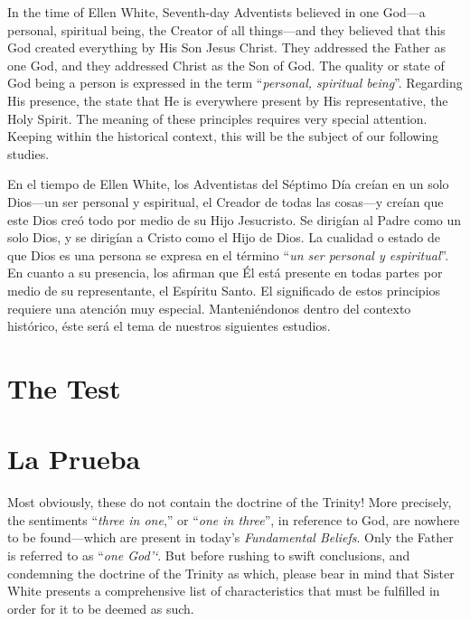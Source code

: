 In the time of Ellen White, Seventh-day Adventists believed in one God—a personal, spiritual being, the Creator of all things—and they believed that this God created everything by His Son Jesus Christ. They addressed the Father as one God, and they addressed Christ as the Son of God. The quality or state of God being a person is expressed in the term “\textit{personal, spiritual being}”. Regarding His presence, the  state that He is everywhere present by His representative, the Holy Spirit. The meaning of these principles requires very special attention. Keeping within the historical context, this will be the subject of our following studies.


En el tiempo de Ellen White, los Adventistas del Séptimo Día creían en un solo Dios—un ser personal y espiritual, el Creador de todas las cosas—y creían que este Dios creó todo por medio de su Hijo Jesucristo. Se dirigían al Padre como un solo Dios, y se dirigían a Cristo como el Hijo de Dios. La cualidad o estado de que Dios es una persona se expresa en el término “\textit{un ser personal y espiritual}”. En cuanto a su presencia, los  afirman que Él está presente en todas partes por medio de su representante, el Espíritu Santo. El significado de estos principios requiere una atención muy especial. Manteniéndonos dentro del contexto histórico, éste será el tema de nuestros siguientes estudios.


\section*{The Test}


\section*{La Prueba}


Most obviously, these  do not contain the doctrine of the Trinity! More precisely, the sentiments “\textit{three in one},” or “\textit{one in three}”, in reference to God, are nowhere to be found—which are present in today’s \textit{Fundamental Beliefs}. Only the Father is referred to as “\textit{one God’‘}. But before rushing to swift conclusions, and condemning the doctrine of the Trinity as which, please bear in mind that Sister White presents a comprehensive list of characteristics that must be fulfilled in order for it to be deemed as such.


